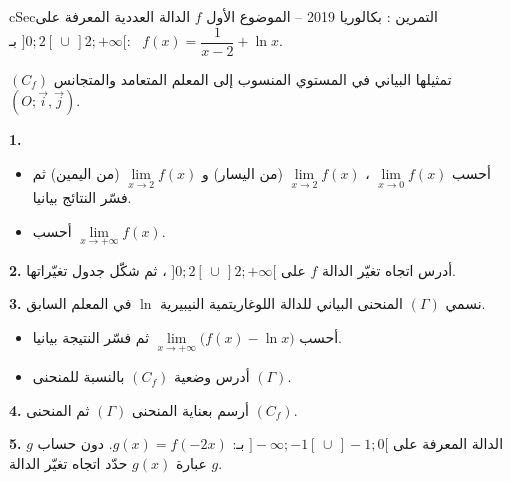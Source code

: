 \documentclass[12pt,a4paper]{article}
\newenvironment{BOX}[2]{\begin{otherlanguage}{english}\begin{arbox}{#1}{#2}}{\end{arbox}\end{otherlanguage}}
\newcounter{exo}
\newenvironment{tamrin}[1]{\stepcounter{exo}\begin{BOX}{cSec}{التمرين \theexo: #1}}{\end{BOX}}
\newenvironment{sq}{\begin{itemize}[leftmargin=2.4em,itemsep=3pt]}{\end{itemize}}
\newcommand{\qa}{\item[(أ)]}\newcommand{\qb}{\item[(ب)]}\newcommand{\qc}{\item[(جـ)]}\newcommand{\qd}{\item[(د)]}\newcommand{\qe}{\item[(هـ)]}
\newcommand{\QQ}[1]{\par\smallskip\textbf{#1.} }
\begin{document}
\begin{tamrin}{بكالوريا 2019 -- الموضوع الأول}
$f$ الدالة العددية المعرفة على $]0;2[\,\cup\,]2;+\infty[$ بـ: \ $f(x)=\dfrac{1}{x-2}+\ln x$.

$(C_f)$ تمثيلها البياني في المستوي المنسوب إلى المعلم المتعامد والمتجانس $(O;\vec i,\vec j)$.
\QQ{1}
\begin{sq}
\qa أحسب $\lim\limits_{x\to0}f(x)$ ، $\lim\limits_{x\to2}f(x)$ (من اليسار) و $\lim\limits_{x\to2}f(x)$ (من اليمين) ثم فسّر النتائج بيانيا.
\qb أحسب $\lim\limits_{x\to+\infty}f(x)$.
\end{sq}
\QQ{2} أدرس اتجاه تغيّر الدالة $f$ على $]0;2[\,\cup\,]2;+\infty[$ ، ثم شكّل جدول تغيّراتها.
\QQ{3} نسمي $(\Gamma)$ المنحنى البياني للدالة اللوغاريتمية النيبيرية $\ln$ في المعلم السابق.
\begin{sq}
\qa أحسب $\lim\limits_{x\to+\infty}\big(f(x)-\ln x\big)$ ثم فسّر النتيجة بيانيا.
\qb أدرس وضعية $(C_f)$ بالنسبة للمنحنى $(\Gamma)$.
\end{sq}
\QQ{4} أرسم بعناية المنحنى $(\Gamma)$ ثم المنحنى $(C_f)$.
\QQ{5} $g$ الدالة المعرفة على $]-\infty;-1[\,\cup\,]-1;0[$ بـ: $g(x)=f(-2x)$. دون حساب عبارة $g(x)$ حدّد اتجاه تغيّر الدالة $g$.
\end{tamrin}
\end{document}
